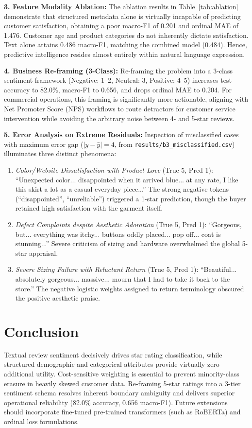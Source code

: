 \documentclass[conference,10pt,a4paper]{IEEEtran}
\begin{document}
\textbf{3. Feature Modality Ablation:} The ablation results in Table~\ref{tab:ablation} demonstrate that structured metadata alone is virtually incapable of predicting customer satisfaction, obtaining a poor macro-F1 of 0.201 and ordinal MAE of 1.476. Customer age and product categories do not inherently dictate satisfaction. Text alone attains 0.486 macro-F1, matching the combined model (0.484). Hence, predictive intelligence resides almost entirely within natural language expression.

\textbf{4. Business Re-framing (3-Class):} Re-framing the problem into a 3-class sentiment framework (Negative: 1--2, Neutral: 3, Positive: 4--5) increases test accuracy to 82.0\%, macro-F1 to 0.656, and drops ordinal MAE to 0.204. For commercial operations, this framing is significantly more actionable, aligning with Net Promoter Score (NPS) workflows to route detractors for customer service intervention while avoiding the arbitrary noise between 4- and 5-star reviews.

\textbf{5. Error Analysis on Extreme Residuals:} Inspection of misclassified cases with maximum error gap ($|y - \hat{y}| = 4$, from \texttt{results/b3\_misclassified.csv}) illuminates three distinct phenomena:
\begin{enumerate}
\item \emph{Color/Website Dissatisfaction with Product Love} (True 5, Pred 1): ``Unexpected color... disappointed when it arrived blue... at any rate, I like this skirt a lot as a casual everyday piece...'' The strong negative tokens (``disappointed'', ``unreliable'') triggered a 1-star prediction, though the buyer retained high satisfaction with the garment itself.
\item \emph{Defect Complaints despite Aesthetic Adoration} (True 5, Pred 1): ``Gorgeous, but... everything was itchy... buttons oddly placed... pop off... coat is stunning...'' Severe criticism of sizing and hardware overwhelmed the global 5-star appraisal.
\item \emph{Severe Sizing Failure with Reluctant Return} (True 5, Pred 1): ``Beautiful... absolutely gorgeous... massive... mourn that I had to take it back to the store.'' The negative logistic weights assigned to return terminology obscured the positive aesthetic praise.
\end{enumerate}

\section{Conclusion}
Textual review sentiment decisively drives star rating classification, while structured demographic and categorical attributes provide virtually zero additional utility. Cost-sensitive weighting is essential to prevent minority-class erasure in heavily skewed customer data. Re-framing 5-star ratings into a 3-tier sentiment schema resolves inherent boundary ambiguity and delivers superior operational reliability (82.0\% accuracy, 0.656 macro-F1). Future extensions should incorporate fine-tuned pre-trained transformers (such as RoBERTa) and ordinal loss formulations.
\end{document}

